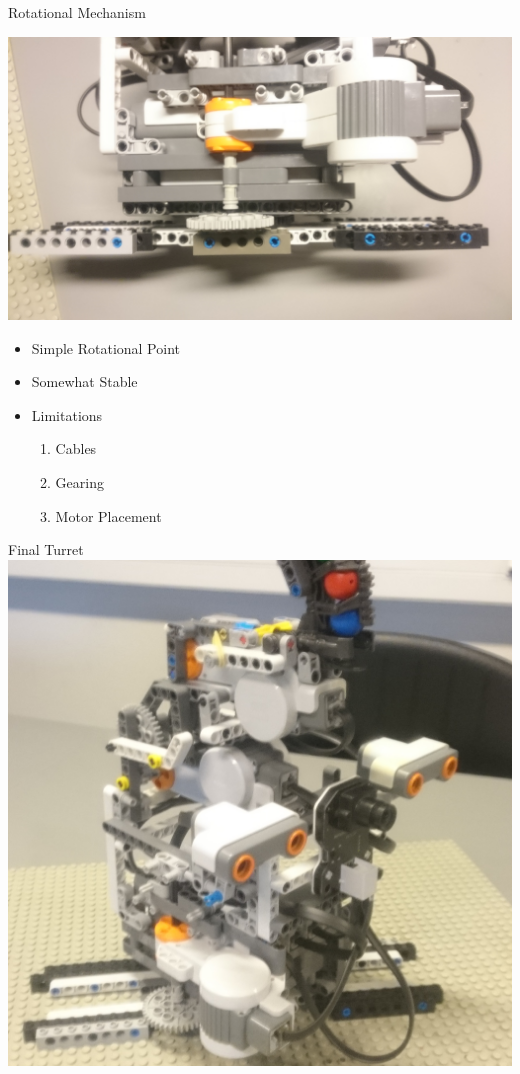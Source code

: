 \begin{frame}{Rotational Mechanism}

\includegraphics[scale=0.065]{figures/RotMech.JPG} 

\begin{itemize}
    \item Simple Rotational Point 
	\item Somewhat Stable
	\item Limitations
		\begin{enumerate}
  			\item Cables
  			\item Gearing
  			\item Motor Placement
		\end{enumerate}
\end{itemize}
\end{frame}

\begin{frame}{Final Turret}
\includegraphics[scale=0.1]{figures/GlorTurret.JPG}  
\end{frame}

